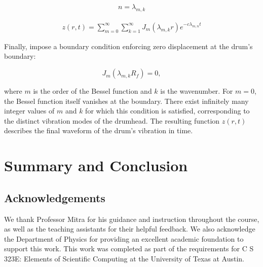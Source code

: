 \documentclass[linenumbers, RNAAS, trackchanges]{aastex631}
\begin{document}
\begin{eqnarray}
    n=\lambda_{m,k}
\end{eqnarray}

\begin{eqnarray}
    z(r,t)=\sum_{m=0}^\infty \sum_{k=1}^\infty J_m(\lambda_{m,k}r)e^{-c\lambda_{m,n}t}
\end{eqnarray}

\noindent Finally, impose a boundary condition enforcing zero displacement at
the drum's boundary:

\begin{equation}
    J_m(\lambda_{m,k}R_f)=0,
\end{equation}

\noindent where $m$ is the order of the Bessel function and $k$ is the wavenumber.
For $m=0$, the Bessel function itself vanishes at the boundary. There exist infinitely
many integer values of $m$ and $k$ for which this condition is satisfied, corresponding
to the distinct vibration modes of the drumhead. The resulting function $z(r,t)$
describes the final waveform of the drum's vibration in time.





\section{Summary and Conclusion} \label{sec:summary}

\subsection{Acknowledgements}
We thank Professor Mitra for his guidance and instruction throughout the course,
as well as the teaching assistants for their helpful feedback. We also
acknowledge the Department of Physics for providing an excellent academic foundation 
to support this work. This work was completed as part of the requirements for 
C S 323E: Elements of Scientific Computing at the University of Texas at Austin.

\newpage


\end{document}
